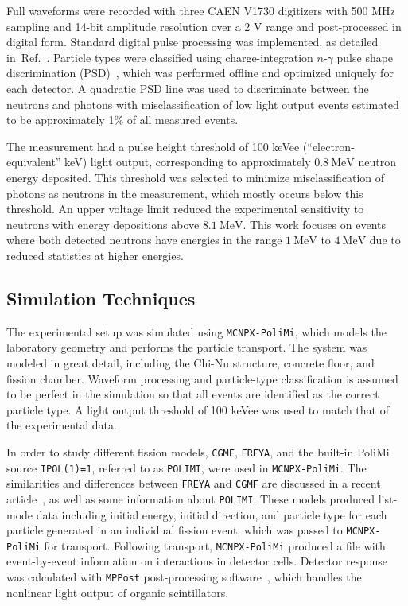 \documentclass[preprint,12pt]{elsarticle}
\newcommand{\refref}[1]  {Ref.~\cite{#1}}
\newcommand{\MPPost}          {\texttt{MPPost}\xspace}
\newcommand{\mcnpxpolimi}     {\texttt{MCNPX-PoliMi}\xspace}
\newcommand{\cgmf}            {\texttt{CGMF}\xspace}
\newcommand{\freya}           {\texttt{FREYA}\xspace}
\newcommand{\polimi}          {\texttt{POLIMI}\xspace}
\newcommand{\genunit}[2]{\ensuremath{#1~\text{#2}}\xspace}
\newcommand{\MeV}[1]    {\genunit{#1}{MeV}}
\begin{document}
Full waveforms were recorded with three CAEN V1730 digitizers with 500 MHz sampling and 14-bit amplitude resolution over a 2 V range and post-processed in digital form. Standard digital pulse processing was implemented, as detailed in~\refref{Marcath2018}. Particle types were classified using charge-integration $n$-$\gamma$ pulse shape discrimination (PSD)~\cite{Polack2015}, which was performed offline and optimized uniquely for each detector. 
A quadratic PSD line was used to discriminate between the neutrons and photons with misclassification of low light output events estimated to be approximately 1\% of all measured events. 

The measurement had a pulse height threshold of 100 keVee (``electron-equivalent'' keV) light output, corresponding to approximately \MeV{0.8} neutron energy deposited. This threshold was selected to minimize misclassification of photons as neutrons in the measurement, which mostly occurs below this threshold. An upper voltage limit reduced the experimental sensitivity to neutrons with energy depositions above \MeV{8.1}. This work focuses on events where both detected neutrons have energies in the range \MeV{1} to \MeV{4} due to reduced statistics at higher energies. 

\subsection{Simulation Techniques}

The experimental setup was simulated using \mcnpxpolimi, which models the laboratory geometry and performs the particle transport. The system was modeled in great detail, including the Chi-Nu structure, concrete floor, and fission chamber. Waveform processing and particle-type classification is assumed to be perfect in the simulation so that all events are identified as the correct particle type. A light output threshold of 100 keVee was used to match that of the experimental data. 

In order to study different fission models, \cgmf, \freya, and the built-in PoliMi source \texttt{IPOL(1)=1}, referred to as \polimi, were used in \mcnpxpolimi. The similarities and differences between \freya and \cgmf are discussed in a recent article~\cite{Talou2018}, as well as some information about \polimi. These models produced list-mode data including initial energy, initial direction, and particle type for each particle generated in an individual fission event, which was passed to \mcnpxpolimi for transport. Following transport, \mcnpxpolimi produced a file with event-by-event information on interactions in detector cells. Detector response was calculated with \MPPost post-processing software~\cite{Miller2012}, which handles the nonlinear light output of organic scintillators.
\end{document}
